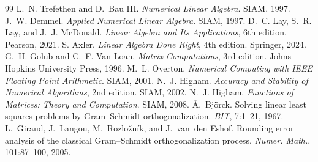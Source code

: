 \documentclass[11pt,oneside]{report}
\begin{document}
\appendix
{}




\begin{thebibliography}{99}
 L.~N. Trefethen and D.~Bau III. \emph{Numerical Linear Algebra}. SIAM, 1997.
 J.~W. Demmel. \emph{Applied Numerical Linear Algebra}. SIAM, 1997.
 D.~C. Lay, S.~R. Lay, and J.~J. McDonald. \emph{Linear Algebra and Its Applications}, 6th edition. Pearson, 2021.
 S. Axler. \emph{Linear Algebra Done Right}, 4th edition. Springer, 2024.
 G.~H. Golub and C.~F. Van Loan. \emph{Matrix Computations}, 3rd edition. Johns Hopkins University Press, 1996.
 M.~L. Overton. \emph{Numerical Computing with IEEE Floating Point Arithmetic}. SIAM, 2001.
 N.~J. Higham. \emph{Accuracy and Stability of Numerical Algorithms}, 2nd edition. SIAM, 2002.
 N.~J. Higham. \emph{Functions of Matrices: Theory and Computation}. SIAM, 2008.
 \AA.~Bj\"orck. Solving linear least squares problems by Gram--Schmidt orthogonalization. \emph{BIT}, 7:1--21, 1967.
 L.~Giraud, J.~Langou, M.~Rozlo\v{z}n\'ik, and J.~van~den Eshof. Rounding error analysis of the classical Gram--Schmidt orthogonalization process. \emph{Numer. Math.}, 101:87--100, 2005.
\end{thebibliography}
\end{document}
